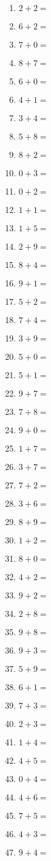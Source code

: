 \documentclass{article}
\begin{document}
\begin{multicols}{5}
\begin{enumerate}
\item $2 + 2 =$
\item $6 + 2 =$
\item $7 + 0 =$
\item $8 + 7 =$
\item $6 + 0 =$
\item $4 + 1 =$
\item $3 + 4 =$
\item $5 + 8 =$
\item $8 + 2 =$
\item $0 + 3 =$
\item $0 + 2 =$
\item $1 + 1 =$
\item $1 + 5 =$
\item $2 + 9 =$
\item $8 + 4 =$
\item $9 + 1 =$
\item $5 + 2 =$
\item $7 + 4 =$
\item $3 + 9 =$
\item $5 + 0 =$
\item $5 + 1 =$
\item $9 + 7 =$
\item $7 + 8 =$
\item $9 + 0 =$
\item $1 + 7 =$
\item $3 + 7 =$
\item $7 + 2 =$
\item $3 + 6 =$
\item $8 + 9 =$
\item $1 + 2 =$
\item $8 + 0 =$
\item $4 + 2 =$
\item $9 + 2 =$
\item $2 + 8 =$
\item $9 + 8 =$
\item $9 + 3 =$
\item $5 + 9 =$
\item $6 + 1 =$
\item $7 + 3 =$
\item $2 + 3 =$
\item $1 + 4 =$
\item $4 + 5 =$
\item $0 + 4 =$
\item $4 + 6 =$
\item $7 + 5 =$
\item $4 + 3 =$
\item $9 + 4 =$

\end{enumerate}
\end{multicols}
\end{document}
